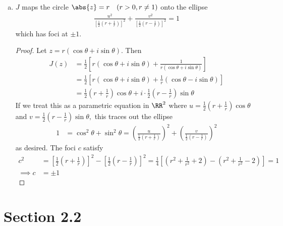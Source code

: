 \documentclass{article}
\begin{document}
\begin{itemize}
\begin{enumerate}[(a)]
			\item $J$ maps the circle $\abs{z}=r\quad (r>0, r\neq 1)$ onto the ellipse
				\begin{align*}
					\frac{u^2}{\left[ \frac{1}{2}\left( r+\frac{1}{r} \right) \right]^2} + \frac{v^2}{\left[ \frac{1}{2}\left( r-\frac{1}{r} \right) \right]^2} = 1
				\end{align*}
				which has foci at $\pm 1.$
				\begin{proof}
					Let $z=r(\cos \theta + i\sin \theta).$ Then
					\begin{align*}
						J(z) &= \frac{1}{2} \left[ r(\cos \theta + i\sin \theta) + \frac{1}{r(\cos \theta + i\sin \theta)} \right] \\
						&= \frac{1}{2}\left[ r(\cos \theta + i\sin \theta) + \frac{1}{r} (\cos \theta - i\sin \theta) \right] \\
						&= \frac{1}{2}\left( r+\frac{1}{r} \right)\cos \theta + i\cdot\frac{1}{2}\left( r-\frac{1}{r} \right)\sin \theta
					\end{align*}
					If we treat this as a parametric equation in $\RR^2$ where $u=\frac{1}{2}\left( r+\frac{1}{r} \right)\cos \theta$ and $v = \frac{1}{2}\left( r-\frac{1}{r} \right)\sin \theta,$ this traces out the ellipse
					\begin{align*}
						1 &= \cos^2\theta+\sin^2\theta = \left( \frac{u}{\frac{1}{2}\left( r+\frac{1}{r} \right)} \right)^2 + \left( \frac{v}{\frac{1}{2}\left( r-\frac{1}{r} \right)} \right)^2
					\end{align*}
					as desired. The foci $c$ satisfy
					\begin{align*}
						c^2 &= \left[ \frac{1}{2}\left( r+\frac{1}{r} \right) \right]^2 - \left[ \frac{1}{2}\left( r-\frac{1}{r} \right) \right]^2 = \frac{1}{4}\left[ \left(r^2+\frac{1}{r^2} + 2\right) - \left( r^2+\frac{1}{r^2} - 2 \right)  \right] = 1 \\
						\implies c &= \pm 1
					\end{align*}
				\end{proof}

		\end{enumerate}
		
\end{itemize}

\section*{Section 2.2}
\end{document}
